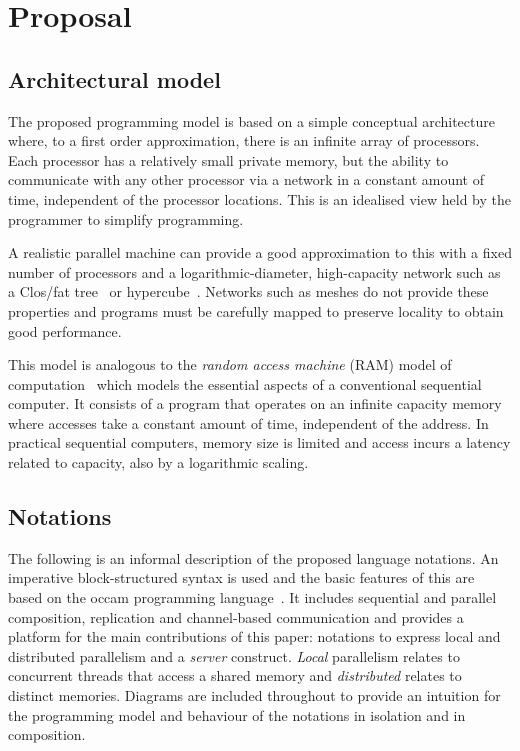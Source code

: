\documentclass[11pt, conference, compsocconf, onecolumn]{IEEEtran}
\newcounter{process}
\begin{document}
\section{Proposal\label{sec:proposal}}

\subsection{Architectural model}

The proposed programming model is based on a simple conceptual architecture
where, to a first order approximation, there is an infinite array of
processors.  Each processor has a relatively small private memory, but the
ability to communicate with any other processor via a network in a constant
amount of time, independent of the processor locations.  This is an idealised
view held by the programmer to simplify programming.

A realistic parallel machine can provide a good approximation to this with a
fixed number of processors and a logarithmic-diameter, high-capacity network
such as a Clos/fat tree~\cite{Leiserson85} or hypercube~\cite{Valiant90}.
Networks such as meshes do not provide these properties and programs must be
carefully mapped to preserve locality to obtain good performance.

This model is analogous to the \emph{random access machine} (RAM)
model of computation~\cite{Cook72} which models the essential aspects of a
conventional sequential computer. It consists of a program that operates on an
infinite capacity memory where accesses take a constant amount of time,
independent of the address.  In practical sequential computers, memory size
is limited and access incurs a latency related to capacity, also by a
logarithmic scaling.

\subsection{Notations}

The following is an informal description of the proposed language notations. An
imperative block-structured syntax is used and the basic features of this are
based on the occam programming language~\cite{Occam83}. It includes sequential
and parallel composition, replication and channel-based communication and
provides a platform for the main contributions of this paper: 
notations to express local and distributed parallelism and a \emph{server}
construct.
\emph{Local} parallelism relates to concurrent threads that access a
shared memory and \emph{distributed} relates to distinct memories.
Diagrams are included throughout to provide an intuition for the programming
model and behaviour of the notations in isolation and in composition.
\end{document}
